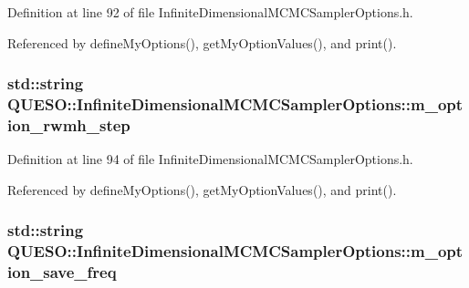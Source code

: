 Definition at line 92 of file Infinite\-Dimensional\-M\-C\-M\-C\-Sampler\-Options.\-h.



Referenced by define\-My\-Options(), get\-My\-Option\-Values(), and print().

\hypertarget{class_q_u_e_s_o_1_1_infinite_dimensional_m_c_m_c_sampler_options_aa76584eb25581942458195d26e032578}{
\subsubsection[{m\-\_\-option\-\_\-rwmh\-\_\-step}]{\setlength{\rightskip}{0pt plus 5cm}std\-::string Q\-U\-E\-S\-O\-::\-Infinite\-Dimensional\-M\-C\-M\-C\-Sampler\-Options\-::m\-\_\-option\-\_\-rwmh\-\_\-step\hspace{0.3cm}{\ttfamily [private]}}}\label{class_q_u_e_s_o_1_1_infinite_dimensional_m_c_m_c_sampler_options_aa76584eb25581942458195d26e032578}


Definition at line 94 of file Infinite\-Dimensional\-M\-C\-M\-C\-Sampler\-Options.\-h.



Referenced by define\-My\-Options(), get\-My\-Option\-Values(), and print().

\hypertarget{class_q_u_e_s_o_1_1_infinite_dimensional_m_c_m_c_sampler_options_ac2ebcd1aff902c0b01fec2366fe775b6}{
\subsubsection[{m\-\_\-option\-\_\-save\-\_\-freq}]{\setlength{\rightskip}{0pt plus 5cm}std\-::string Q\-U\-E\-S\-O\-::\-Infinite\-Dimensional\-M\-C\-M\-C\-Sampler\-Options\-::m\-\_\-option\-\_\-save\-\_\-freq\hspace{0.3cm}{\ttfamily [private]}}}\label{class_q_u_e_s_o_1_1_infinite_dimensional_m_c_m_c_sampler_options_ac2ebcd1aff902c0b01fec2366fe775b6}


